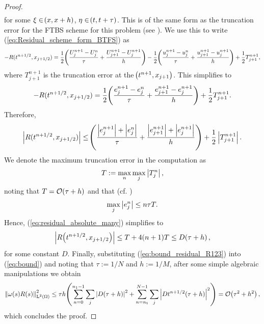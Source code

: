 \documentclass[final]{amsart}
\numberwithin{equation}{section}
\begin{document}
\begin{proof}
\begin{equation}
\begin{aligned}
\end{aligned}
\end{equation}
for some $\xi\in\!\left({x,x+h}\right)$, $\eta \in\!\left({t, t+\tau}\right)$. This is of the same form as the truncation error for the FTBS  scheme for this problem (see \cite[\S4]{morton2005numerical}).  We use this to write (\ref{eq:Residual_scheme_form_BTFS}) as
\begin{equation}
\begin{aligned}
-R(t^{n+1/2}, x_{j+1/2})=\frac{1}{2}\!\left({\frac{U^{n+1}_j - U^n_j}{\tau}
+
\frac{U^{n+1}_{j+1} - U^{n+1}_{j} }{h}}\right)
-\frac{1}{2}\!\left({\frac{u^{n+1}_j-u^n_j}{\tau}
+
\frac{u^{n+1}_{j+1}-u^{n+1}_j}{h}}\right)
+
\frac{1}{2}T^{n+1}_{j+1},
\end{aligned}
\end{equation}
where $T^{n+1}_{j+1}$  is the truncation error at the $\!\left({t^{n+1},x_{j+1}}\right)$.
This simplifies to 
\begin{equation}
\begin{aligned}
-R(t^{n+1/2}, x_{j+1/2})
=
\frac{1}{2}\!\left({\frac{e^{n+1}_j - e^n_j}{\tau}	
+
\frac{e^{n+1}_{j+1} - e^{n+1}_{j} }{h}}\right)
+
\frac{1}{2}{T^{n+1}_{j+1}}.
\end{aligned}
\end{equation}
Therefore,
\begin{equation}\label{eq:residual_absolute_many}
\left|R(t^{n+1/2}, x_{j+1/2})\right|
\leq 
\!\left({\frac{\left|e^{n+1}_j\right| + \left|e^n_j\right|}{\tau}	
	+
	\frac{\left|e^{n+1}_{j+1}\right| +\left| e^{n+1}_{j} \right|}{h}}\right) +\frac{1}{2}\left|T^{n+1}_{j+1}\right|.
\end{equation}
We denote the maximum truncation error in the computation as
\begin{equation}
T:=\max_n\max_{j}\left|T^n_j\right|,
\end{equation}
noting that  $T=\mathcal{O}\!\left({\tau+h}\right)$ and that (cf. \cite{morton2005numerical})
\begin{equation}
\max_j\left|e^n_j\right|\leq n\tau T.
\end{equation}
Hence,  (\ref{eq:residual_absolute_many}) simplifies to  
\begin{equation}\label{eq:bound_residual_R123}
\left|R\!\left({t^{n+1/2},x_{j+1/2}}\right)\right|\leq T+4(n+1)T\leq D\!\left({\tau+h}\right),
\end{equation}
for some constant $D$. Finally, substituting (\ref{eq:bound_residual_R123})  into (\ref{eq:bound}) and noting that  $\tau:=1/N$ and $h:=1/M$, after some simple algebraic manipulations we obtain
\begin{equation}
\begin{aligned}
  \left\|\omega(s) R(s)\right\|_{\operatorname L^{2}(\Omega)}^2
  \leq
  \tau h\!\left({
   \sum_{n=0}^{n_1-1}\sum_{j} \left|D\!\left({\tau+h}\right)\right|^2
+
\sum_{n=n_1}^{N-1}\sum_{j} \left|Dt^{n+1/2} \!\left({\tau+h}\right)\right|^2}\right)
  =\mathcal{O}\!\left({\tau^2+h^2}\right),
\end{aligned}
\end{equation}
which concludes the proof.  
\end{proof}
\end{document}
